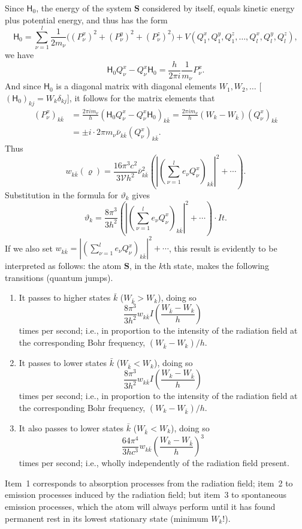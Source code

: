 \documentclass[fontsize=13pt,twoside,openany,headings=normal,parskip=false,bookmarkpackage=false,DIV=calc]{scrbook}
\begin{document}
\hypertarget{origpage-156}{}%
Since $\mathsf{H}_0$, the energy of the system $\boldsymbol{S}$ considered by itself, equals kinetic energy plus potential energy, and thus has the form
\[
 \mathsf{H}_0=\sum_{\nu=1}^{l}\frac1{2m_\nu}\bigl((P_\nu^x)^2+(P_\nu^y)^2+(P_\nu^z)^2\bigr)
 +V(Q_1^x,Q_1^y,Q_1^z,\ldots,Q_l^x,Q_l^y,Q_l^z),
\]
we have
\[
 \mathsf{H}_0Q_\nu^x-Q_\nu^x\mathsf{H}_0=\frac h{2\pi i}\frac1{m_\nu}P_\nu^x.
\]
And since $\mathsf{H}_0$ is a diagonal matrix with diagonal elements $W_1,W_2,\ldots$ [$(\mathsf{H}_0)_{kj}=W_k\delta_{kj}$], it follows for the matrix elements that
\begin{align*}
 (P_\nu^x)_{k\bar k}
 &=\frac{2\pi i m_\nu}{h}(\mathsf{H}_0Q_\nu^x-Q_\nu^x\mathsf{H}_0)_{k\bar k}
 =\frac{2\pi i m_\nu}{h}(W_k-W_{\bar k})(Q_\nu^x)_{k\bar k}\\
 &=\pm i\cdot2\pi m_\nu\bar\nu_{k\bar k}(Q_\nu^x)_{k\bar k}.
\end{align*}
Thus
\[
 w_{k\bar k}(\varrho)=\frac{16\pi^3c^2}{3\mathcal Vh^2}\bar\nu_{k\bar k}^{2}
 \left(\left|\left(\sum_{\nu=1}^{l}e_\nu Q_\nu^x\right)_{k\bar k}\right|^2+\cdots\right).
\]
Substitution in the formula for $\vartheta_k$ gives
\[
 \vartheta_k=\frac{8\pi^3}{3h^2}
 \left(\left|\left(\sum_{\nu=1}^{l}e_\nu Q_\nu^x\right)_{k\bar k}\right|^2+\cdots\right)\cdot It.
\]
If we also set $w_{k\bar k}=\left|\left(\sum_{\nu=1}^{l}e_\nu Q_\nu^x\right)_{k\bar k}\right|^2+\cdots$, this result is evidently to be interpreted as follows: the atom $\boldsymbol{S}$, in the $k$th state, makes the following transitions (quantum jumps).
\begin{enumerate}
 \item It passes to higher states $\bar k$ ($W_{\bar k}>W_k$), doing so
 \[
 \frac{8\pi^3}{3h^2}w_{k\bar k}I\left(\frac{W_{\bar k}-W_k}{h}\right)
 \]
 times per second; i.e., in proportion to the intensity of the radiation field at the corresponding Bohr frequency, $(W_{\bar k}-W_k)/h$.
 \item It passes to lower states $\bar k$ ($W_{\bar k}<W_k$), doing so
 \[
 \frac{8\pi^3}{3h^2}w_{k\bar k}I\left(\frac{W_k-W_{\bar k}}{h}\right)
 \]
 times per second; i.e., in proportion to the intensity of the radiation field at the corresponding Bohr frequency, $(W_k-W_{\bar k})/h$.
 \item It also passes to lower states $\bar k$ ($W_{\bar k}<W_k$), doing so
 \[
 \frac{64\pi^4}{3hc^3}w_{k\bar k}\left(\frac{W_k-W_{\bar k}}{h}\right)^3
 \]
 times per second; i.e., wholly independently of the radiation field present.
\end{enumerate}
Item~1 corresponds to absorption processes from the radiation field; item~2 to emission processes induced by the radiation field; but item~3 to spontaneous emission processes, which the atom will always perform until it has found permanent rest in its lowest stationary state (minimum $W_k$!).
\end{document}
